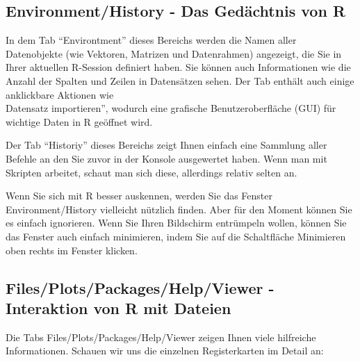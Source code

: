 \documentclass[
]{book}
\begin{document}
\hypertarget{environmenthistory---das-geduxe4chtnis-von-r}{%
\subsection{Environment/History - Das Gedächtnis von R}\label{environmenthistory---das-geduxe4chtnis-von-r}}

In dem Tab ``Environtment'' dieses Bereichs werden die Namen aller Datenobjekte (wie Vektoren, Matrizen und Datenrahmen) angezeigt, die Sie in Ihrer aktuellen R-Session definiert haben. Sie können auch Informationen wie die Anzahl der Spalten und Zeilen in Datensätzen sehen. Der Tab enthält auch einige anklickbare Aktionen wie\\
Datensatz importieren'', wodurch eine grafische Benutzeroberfläche (GUI) für wichtige Daten in R geöffnet wird.

Der Tab ``Historiy'' dieses Bereichs zeigt Ihnen einfach eine Sammlung aller Befehle an den Sie zuvor in der Konsole ausgewertet haben. Wenn man mit Skripten arbeitet, schaut man sich diese, allerdings relativ selten an.

Wenn Sie sich mit R besser auskennen, werden Sie das Fenster Environment/History vielleicht nützlich finden. Aber für den Moment können Sie es einfach ignorieren. Wenn Sie Ihren Bildschirm entrümpeln wollen, können Sie das Fenster auch einfach minimieren, indem Sie auf die Schaltfläche Minimieren oben rechts im Fenster klicken.

\hypertarget{filesplotspackageshelpviewer---interaktion-von-r-mit-dateien}{%
\subsection{Files/Plots/Packages/Help/Viewer - Interaktion von R mit Dateien}\label{filesplotspackageshelpviewer---interaktion-von-r-mit-dateien}}

Die Tabs Files/Plots/Packages/Help/Viewer zeigen Ihnen viele hilfreiche Informationen. Schauen wir uns die einzelnen Registerkarten im Detail an:
\end{document}
